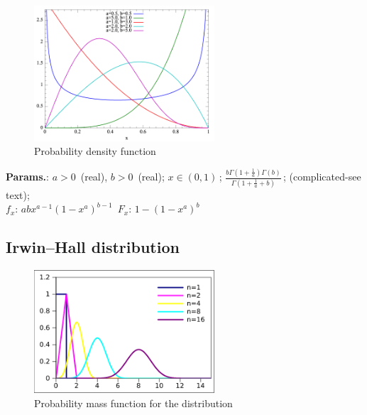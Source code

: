     \begin{figure}[H]
        \centering
        \includegraphics[width=0.6\textwidth]{images/KumaraswamyT pdf.png}
        \caption{Probability density function}
    \end{figure}




    {\color{darkblue} \textbf{Params.}:} {$a>0\,$ (real),  $b>0\,$ (real)}; {$x \in (0,1)\,$}; {$\frac{b\Gamma(1+\tfrac{1}{a})\Gamma(b)}{\Gamma(1+\tfrac{1}{a}+b)}\,$}; {(complicated-see text)};\hspace{0.5cm}\\{\color{darkblue} \textbf{$f_x$}:} {$abx^{a-1}(1-x^a)^{b-1}\,$}{\color{darkblue} \textbf{$F_x$}:} {$1-(1-x^a)^b$}



    
        
\subsection{Irwin–Hall distribution}


    \begin{figure}[H]
        \centering
        \includegraphics[width=0.6\textwidth]{images/irwin-hall-pdf.png}
        \caption{Probability mass function for the distribution}
    \end{figure}




